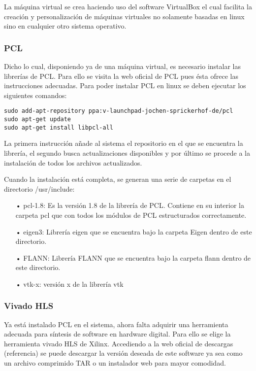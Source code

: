 La máquina virtual se crea haciendo uso del software VirtualBox el cual facilita la creación y personalización de máquinas virtuales no solamente basadas en linux sino en cualquier otro sistema operativo.


\subsubsection{PCL}
Dicho lo cual, disponiendo ya de una máquina virtual, es necesario instalar las librerías de PCL. Para ello se visita la web oficial de PCL pues ésta ofrece las instrucciones adecuadas. Para poder instalar PCL en linux se deben ejecutar los siguientes comandos:


\begin{verbatim}
sudo add-apt-repository ppa:v-launchpad-jochen-sprickerhof-de/pcl
sudo apt-get update
sudo apt-get install libpcl-all
\end{verbatim}

La primera instrucción añade al sistema el repositorio en el que se encuentra la librería, el segundo busca actualizaciones disponibles y por último se procede a la instalación de todos los archivos actualizados.

Cuando la instalación está completa, se generan una serie de carpetas en el directorio /usr/include:

\begin{itemize}
\item[•]pcl-1.8: Es la versión 1.8 de la librería de PCL. Contiene en su interior la carpeta pcl que con todos los módulos de PCL estructurados correctamente.
\item[•]eigen3: Librería eigen que se encuentra bajo la carpeta Eigen dentro de este directorio.
\item[•]FLANN: Librería FLANN que se encuentra bajo la carpeta flann dentro de este directorio.
\item[•]vtk-x: versión x de la librería vtk 
\end{itemize}

\subsubsection{Vivado HLS}
Ya está instalado PCL en el sistema, ahora falta adquirir una herramienta adecuada para síntesis de software en hardware digital. Para ello se elige la herramienta vivado HLS de Xilinx. Accediendo a la web oficial de descargas (referencia) se puede descargar la versión deseada de este software ya sea como un archivo comprimido TAR o un instalador web para mayor comodidad.

